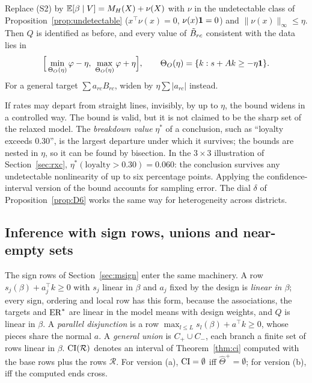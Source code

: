 \begin{proposition}\label{prop:S1}
Replace (S2) by $\mathbb E[\beta\mid V]=M_H(X)+\nu(X)$ with $\nu$ in the undetectable class
of Proposition~\ref{prop:undetectable} ($x^\top\nu(x)=0$, $\nu(x)\mathbf 1=0$) and
$\|\nu(x)\|_\infty\le\eta$. Then $Q$ is identified as before, and every value of
$\tilde B_{rc}$ consistent with the data lies in
\[
\Big[\min_{\ThO(\eta)}\varphi-\eta,\ \max_{\ThO(\eta)}\varphi+\eta\Big],\qquad
\ThO(\eta)=\{k:s+Ak\ge-\eta\one\}.
\]
For a general target $\sum a_{rc}B_{rc}$, widen by $\eta\sum|a_{rc}|$ instead.
\end{proposition}
\begin{reading}
If rates may depart from straight lines, invisibly, by up to $\eta$, the bound
widens in a controlled way. The bound is valid, but it is not claimed to be the
sharp set of the relaxed model. The \emph{breakdown value} $\eta^*$ of a
conclusion, such as ``loyalty exceeds 0.30'', is the largest departure under which
it survives; the bounds are nested in $\eta$, so it can be found by bisection. In
the $3\times3$ illustration of Section~\ref{sec:rxc}, $\eta^*(\text{loyalty}>0.30)=0.060$:
the conclusion survives any undetectable nonlinearity of up to six percentage
points. Applying the confidence-interval version of the bound accounts for
sampling error. The dial $\delta$ of Proposition~\ref{prop:D6} works the same way
for heterogeneity across districts.
\end{reading}

\subsection{Inference with sign rows, unions and near-empty sets}\label{sec:R10}

The sign rows of Section~\ref{sec:msign} enter the same machinery. A row
$s_j(\beta)+a_j^\top k\ge0$ with $s_j$ linear in $\beta$ and $a_j$ fixed by the design
is \emph{linear in $\beta$}; every sign, ordering and local row has this form,
because the associations, the targets and $\mathrm{ER}^*$ are linear in the model means
with design weights, and $Q$ is linear in $\beta$. A \emph{parallel disjunction} is
a row $\max_{l\le L}s_l(\beta)+a^\top k\ge0$, whose pieces share the normal $a$. A
\emph{general union} is $C_+\cup C_-$, each branch a finite set of rows linear in
$\beta$. $\mathrm{CI}(\mathcal R)$ denotes an interval of Theorem~\ref{thm:ci} computed with the
base rows plus the rows $\mathcal R$. For version (a), $\mathrm{CI}=\emptyset$ iff
$\hat\Theta^+=\emptyset$; for version (b), iff the computed ends cross.

